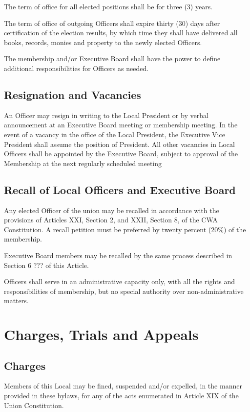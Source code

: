 \documentclass[11pt]{article}
\begin{document}
The term of office for all elected positions shall be for three (3) years.

The term of office of outgoing Officers shall expire thirty (30) days after certification of the election results, by which time they shall have delivered all books, records, monies and property to the newly elected Officers.

The membership and/or Executive Board shall have the power to define additional responsibilities for Officers as needed.

\subsection{Resignation and Vacancies}
An Officer may resign in writing to the Local President or by verbal announcement at an Executive Board meeting or membership meeting. In the event of a vacancy in the office of the Local President, the Executive Vice President shall assume the position of President. All other vacancies in Local Officers shall be appointed by the Executive Board, subject to approval of the Membership at the next regularly scheduled meeting

\subsection{Recall of Local Officers and Executive Board}
Any elected Officer of the union may be recalled in accordance with the provisions of Articles XXI, Section 2, and XXII, Section 8, of the CWA Constitution. A recall petition must be preferred by twenty percent (20\%) of the membership.

Executive Board members may be recalled by the same process described in Section 6 ??? of this Article.

Officers shall serve in an administrative capacity only, with all the rights and responsibilities of membership, but no special authority over non-administrative matters.

\section{Charges, Trials and Appeals}
\subsection{Charges}
Members of this Local may be fined, suspended and/or expelled, in the manner provided in these bylaws, for any of  the acts enumerated in Article XIX of the Union Constitution.
\end{document}
